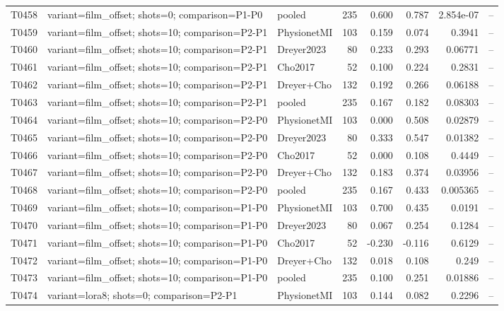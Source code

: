 \begin{longtable}{p{.45in}p{2.6in}p{.75in}rrrrr}
T0458 & variant=film\_\allowbreak{}offset; shots=0; comparison=P1-P0 & pooled & 235 & 0.600 & 0.787 & 2.854e-07 & -- \\
T0459 & variant=film\_\allowbreak{}offset; shots=10; comparison=P2-P1 & PhysionetMI & 103 & 0.159 & 0.074 & 0.3941 & -- \\
T0460 & variant=film\_\allowbreak{}offset; shots=10; comparison=P2-P1 & Dreyer2023 & 80 & 0.233 & 0.293 & 0.06771 & -- \\
T0461 & variant=film\_\allowbreak{}offset; shots=10; comparison=P2-P1 & Cho2017 & 52 & 0.100 & 0.224 & 0.2831 & -- \\
T0462 & variant=film\_\allowbreak{}offset; shots=10; comparison=P2-P1 & Dreyer+Cho & 132 & 0.192 & 0.266 & 0.06188 & -- \\
T0463 & variant=film\_\allowbreak{}offset; shots=10; comparison=P2-P1 & pooled & 235 & 0.167 & 0.182 & 0.08303 & -- \\
T0464 & variant=film\_\allowbreak{}offset; shots=10; comparison=P2-P0 & PhysionetMI & 103 & 0.000 & 0.508 & 0.02879 & -- \\
T0465 & variant=film\_\allowbreak{}offset; shots=10; comparison=P2-P0 & Dreyer2023 & 80 & 0.333 & 0.547 & 0.01382 & -- \\
T0466 & variant=film\_\allowbreak{}offset; shots=10; comparison=P2-P0 & Cho2017 & 52 & 0.000 & 0.108 & 0.4449 & -- \\
T0467 & variant=film\_\allowbreak{}offset; shots=10; comparison=P2-P0 & Dreyer+Cho & 132 & 0.183 & 0.374 & 0.03956 & -- \\
T0468 & variant=film\_\allowbreak{}offset; shots=10; comparison=P2-P0 & pooled & 235 & 0.167 & 0.433 & 0.005365 & -- \\
T0469 & variant=film\_\allowbreak{}offset; shots=10; comparison=P1-P0 & PhysionetMI & 103 & 0.700 & 0.435 & 0.0191 & -- \\
T0470 & variant=film\_\allowbreak{}offset; shots=10; comparison=P1-P0 & Dreyer2023 & 80 & 0.067 & 0.254 & 0.1284 & -- \\
T0471 & variant=film\_\allowbreak{}offset; shots=10; comparison=P1-P0 & Cho2017 & 52 & -0.230 & -0.116 & 0.6129 & -- \\
T0472 & variant=film\_\allowbreak{}offset; shots=10; comparison=P1-P0 & Dreyer+Cho & 132 & 0.018 & 0.108 & 0.249 & -- \\
T0473 & variant=film\_\allowbreak{}offset; shots=10; comparison=P1-P0 & pooled & 235 & 0.100 & 0.251 & 0.01886 & -- \\
T0474 & variant=lora8; shots=0; comparison=P2-P1 & PhysionetMI & 103 & 0.144 & 0.082 & 0.2296 & -- \\

\end{longtable}
